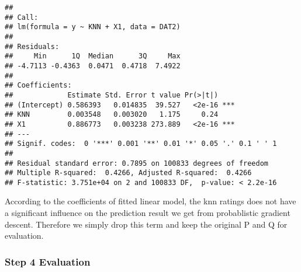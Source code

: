\documentclass[]{article}
\newenvironment{Shaded}{\begin{snugshade}}{\end{snugshade}}
\newcommand{\DataTypeTok}[1]{\textcolor[rgb]{0.13,0.29,0.53}{#1}}
\newcommand{\DecValTok}[1]{\textcolor[rgb]{0.00,0.00,0.81}{#1}}
\newcommand{\KeywordTok}[1]{\textcolor[rgb]{0.13,0.29,0.53}{\textbf{#1}}}
\newcommand{\NormalTok}[1]{#1}
\newcommand{\OperatorTok}[1]{\textcolor[rgb]{0.81,0.36,0.00}{\textbf{#1}}}
\newcommand{\StringTok}[1]{\textcolor[rgb]{0.31,0.60,0.02}{#1}}
\begin{document}
\begin{verbatim}
## 
## Call:
## lm(formula = y ~ KNN + X1, data = DAT2)
## 
## Residuals:
##     Min      1Q  Median      3Q     Max 
## -4.7113 -0.4363  0.0471  0.4718  7.4922 
## 
## Coefficients:
##             Estimate Std. Error t value Pr(>|t|)    
## (Intercept) 0.586393   0.014835  39.527   <2e-16 ***
## KNN         0.003548   0.003020   1.175     0.24    
## X1          0.886773   0.003238 273.889   <2e-16 ***
## ---
## Signif. codes:  0 '***' 0.001 '**' 0.01 '*' 0.05 '.' 0.1 ' ' 1
## 
## Residual standard error: 0.7895 on 100833 degrees of freedom
## Multiple R-squared:  0.4266, Adjusted R-squared:  0.4266 
## F-statistic: 3.751e+04 on 2 and 100833 DF,  p-value: < 2.2e-16
\end{verbatim}

According to the coefficients of fitted linear model, the knn ratings
does not have a significant influence on the prediction result we get
from probablistic gradient descent. Therefore we simply drop this term
and keep the original P and Q for evaluation.

\hypertarget{step-4-evaluation}{%
\subsubsection{Step 4 Evaluation}\label{step-4-evaluation}}

\begin{Shaded}
\end{Shaded}
\end{document}
